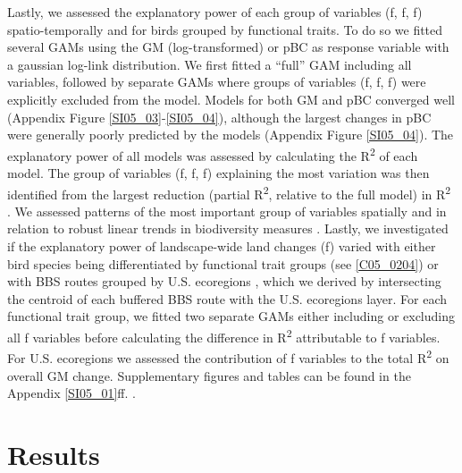 Lastly, we assessed the explanatory power of each group of variables (f, f, f) spatio-temporally and for birds grouped by functional traits. To do so we fitted several GAMs using the GM (log-transformed) or pBC as response variable with a gaussian log-link distribution. We first fitted a “full” GAM including all variables, followed by separate GAMs where groups of variables (f, f, f) were explicitly excluded from the model. Models for both GM and pBC converged well (Appendix Figure \ref{SI05_03}-\ref{SI05_04}), although the largest changes in pBC were generally poorly predicted by the models (Appendix Figure \ref{SI05_04}). The explanatory power of all models was assessed by calculating the R\textsuperscript{2} of each model. The group of variables (f, f, f) explaining the most variation was then identified from the largest reduction (partial R\textsuperscript{2}, relative to the full model) in R\textsuperscript{2} \citep{Papagiannopoulou2017}. We assessed patterns of the most important group of variables spatially and in relation to robust linear trends in biodiversity measures \citep[fitted using the MASS package, ver. 7.3-49,][]{Venables2002}. Lastly, we investigated if the explanatory power of landscape-wide land changes (f) varied with either bird species being differentiated by functional trait groups (see \ref{C05_0204}) or with BBS routes grouped by U.S. ecoregions \citep[Level 1,][]{Omernik1987}, which we derived by intersecting the centroid of each buffered BBS route with the U.S. ecoregions layer. For each functional trait group, we fitted two separate GAMs either including or excluding all f variables before calculating the difference in R\textsuperscript{2} attributable to f variables. For U.S. ecoregions we assessed the contribution of f variables to the total R\textsuperscript{2} on overall GM change. Supplementary figures and tables can be found in the Appendix \ref{SI05_01}ff. .

\section{Results}
\label{C05_03}

